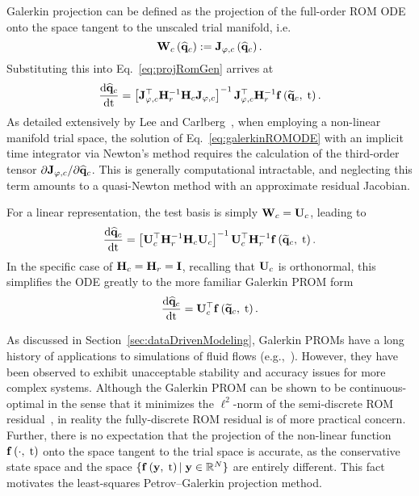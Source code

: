 Galerkin projection can be defined as the projection of the full-order ROM ODE onto the space tangent to the unscaled trial manifold, i.e.
%
\begin{equation}
    \testBasisCons\left(\consVecCoef\right) \defEq \jacobTrialConsFunc{\consVecCoef}.
\end{equation}
%
Substituting this into Eq.~\ref{eq:projRomGen} arrives at
%
\begin{equation}\label{eq:galerkinROMODE}
    \ode{\consVecCoef}{\timeVar} = \left[\jacobTrialCons^\top \resScaleInv \consScale \jacobTrialCons\right]^{-1} \jacobTrialCons^\top \resScaleInv \rhsFunc{\consVecRom, \; \timeVar}.
\end{equation}
%
As detailed extensively by Lee and Carlberg~\cite{Lee2020}, when employing a non-linear manifold trial space, the solution of Eq.~\ref{eq:galerkinROMODE} with an implicit time integrator via Newton's method requires the calculation of the third-order tensor $\partial \mathbf{J}_{\varphi,c} / \partial \mathbf{\widehat{q}}_{c}$. This is generally computational intractable, and neglecting this term amounts to a quasi-Newton method with an approximate residual Jacobian.

For a linear representation, the test basis is simply $\testBasisCons = \consTrial$, leading to
%
\begin{equation}\label{eq:galerkinROMODELinear}
	\ode{\consVecCoef}{\timeVar} = \left[\consTrial^\top \resScaleInv \consScale \consTrial\right]^{-1} \consTrial^\top \resScaleInv \rhsFunc{\consVecRom, \; \timeVar}.
\end{equation}
%
In the specific case of $\consScale = \resScale = \identMat$, recalling that $\consTrial$ is orthonormal, this simplifies the ODE greatly to the more familiar Galerkin PROM form
%
\begin{equation}\label{eq:galerkinROMODELinearSimple}
    \ode{\consVecCoef}{\timeVar} = \consTrial^\top \rhsFunc{\consVecRom, \; \timeVar}.
\end{equation}

As discussed in Section~\ref{sec:dataDrivenModeling}, Galerkin PROMs have a long history of applications to simulations of fluid flows (e.g.,~\cite{Aubry1988,Cazemier1998,BuiThanh2007}). However, they have been observed to exhibit unacceptable stability and accuracy issues for more complex systems. Although the Galerkin PROM can be shown to be continuous-optimal in the sense that it minimizes the $\ell^2$-norm of the semi-discrete ROM residual~\cite{Carlberg2017}, in reality the fully-discrete ROM residual is of more practical concern. Further, there is no expectation that the projection of the non-linear function $\mathbf{f} \left(\cdot, \; \text{t}\right)$ onto the space tangent to the trial space is accurate, as the conservative state space and the space $\{\mathbf{f} \left(\mathbf{y}, \; \text{t}\right) \vert \; \mathbf{y} \in \mathbb{R}^{N} \}$ are entirely different. This fact motivates the least-squares Petrov--Galerkin projection method.

